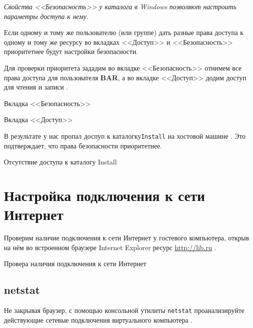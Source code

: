 \textit{Свойства <<Безопасность>> у каталога в Windows
позволяют настроить параметры доступа к нему.}

Если одному и тому же пользователю (или группе) дать разные права доступа
к одному и тому же ресурсу во вкладках <<Доступ>> и <<Безопасность>>
приоритетнее будут настройки безопасности.\par
Для проверки приоритета зададим во вкладке <<Безопасность>>
отнимем все права доступа для пользователя \textbf{BAR},
а во вкладке <<Доступ>> додим доступ для чтения и записи
.

\begin{image}
	\caption{Вкладка <<Безопасность>>}
	\label{fig:dir:prop:satery}
\end{image}

\begin{image}
	\caption{Вкладка <<Доступ>>}
	\label{fig:dir:prop}
\end{image}

В результате у нас пропал доспуп к каталогку\texttt{Install}
на хостовой машине .
Это подтверждает, что права безопасности приоритетнее.

\begin{image}
	\caption{Отсутствие доступа к каталогу Install}
	\label{fig:dir:install:error}
\end{image}

\section{Настройка подключения к сети Интернет}

Проверим наличие подключения к сети Интернет у гостевого компьютера,
открыв на нём во встроенном браузере Internet Explorer
ресурс \url{http://lib.ru} .

\begin{image}
	\caption{Провера наличия подключения к сети Интернет}
	\label{fig:lib}
\end{image}

\subsection{netstat}

Не закрывая браузер, с помощью консольной утилиты
\texttt{netstat} проанализируйте действующие сетевые подключения виртуального
компьютера .

